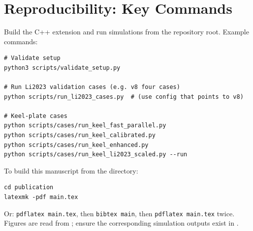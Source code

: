 \section{Reproducibility: Key Commands}
\label{sec:repro}

Build the C++ extension and run simulations from the repository root. Example commands:

\begin{verbatim}
# Validate setup
python3 scripts/validate_setup.py

# Run Li2023 validation cases (e.g. v8 four cases)
python scripts/run_li2023_cases.py  # (use config that points to v8)

# Keel-plate cases
python scripts/cases/run_keel_fast_parallel.py
python scripts/cases/run_keel_calibrated.py
python scripts/cases/run_keel_enhanced.py
python scripts/cases/run_keel_li2023_scaled.py --run
\end{verbatim}

To build this manuscript from the  directory:
\begin{verbatim}
cd publication
latexmk -pdf main.tex
\end{verbatim}
Or: \texttt{pdflatex main.tex}, then \texttt{bibtex main}, then \texttt{pdflatex main.tex} twice. Figures are read from ; ensure the corresponding simulation outputs exist in .
